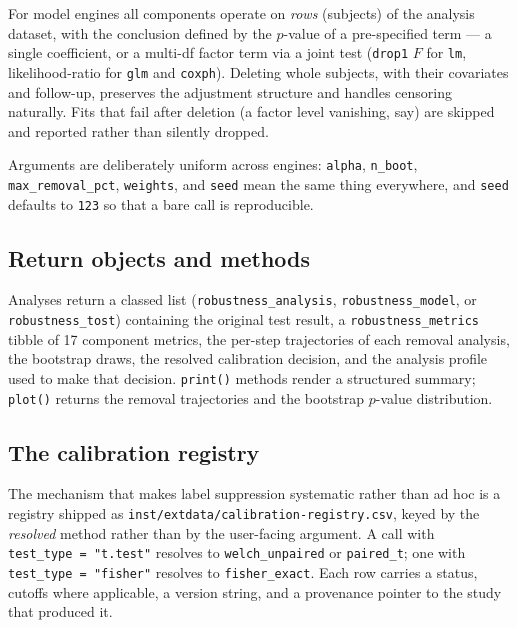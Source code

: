 For model engines all components operate on \emph{rows} (subjects) of the analysis
dataset, with the conclusion defined by the \(p\)-value of a pre-specified term
--- a single coefficient, or a multi-df factor term via a joint test
(\texttt{drop1} \(F\) for \texttt{lm}, likelihood-ratio for \texttt{glm} and \texttt{coxph}). Deleting whole
subjects, with their covariates and follow-up, preserves the adjustment
structure and handles censoring naturally. Fits that fail after deletion
(a factor level vanishing, say) are skipped and reported rather than silently
dropped.

Arguments are deliberately uniform across engines: \texttt{alpha}, \texttt{n\_boot},
\texttt{max\_removal\_pct}, \texttt{weights}, and \texttt{seed} mean the same thing everywhere, and
\texttt{seed} defaults to \texttt{123} so that a bare call is reproducible.

\subsection{Return objects and methods}\label{return-objects-and-methods}

Analyses return a classed list (\texttt{robustness\_analysis}, \texttt{robustness\_model}, or
\texttt{robustness\_tost}) containing the original test result, a
\texttt{robustness\_metrics} tibble of 17 component metrics, the per-step trajectories
of each removal analysis, the bootstrap draws, the resolved calibration
decision, and the analysis profile used to make that decision. \texttt{print()}
methods render a structured summary; \texttt{plot()} returns the removal trajectories
and the bootstrap \(p\)-value distribution.

\subsection{The calibration registry}\label{the-calibration-registry}

The mechanism that makes label suppression systematic rather than ad hoc is a
registry shipped as \texttt{inst/extdata/calibration-registry.csv}, keyed by the
\emph{resolved} method rather than by the user-facing argument. A call with
\texttt{test\_type\ =\ "t.test"} resolves to \texttt{welch\_unpaired} or \texttt{paired\_t}; one with
\texttt{test\_type\ =\ "fisher"} resolves to \texttt{fisher\_exact}. Each row carries a status,
cutoffs where applicable, a version string, and a provenance pointer to the
study that produced it.

